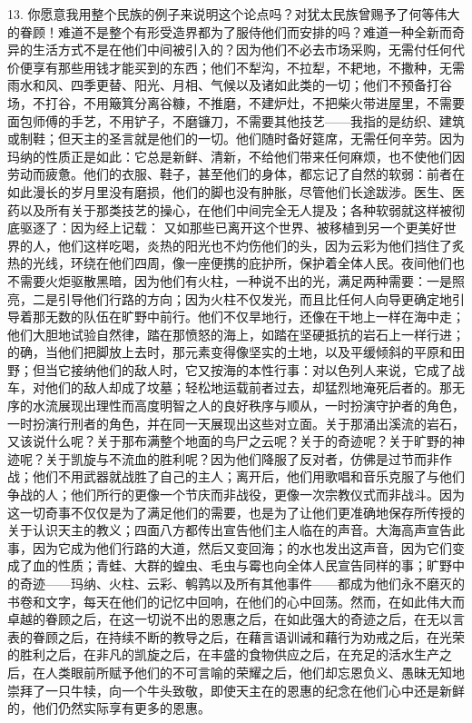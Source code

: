 13. 你愿意我用整个民族的例子来说明这个论点吗？对犹太民族曾赐予了何等伟大的眷顾！难道不是整个有形受造界都为了服侍他们而安排的吗？难道一种全新而奇异的生活方式不是在他们中间被引入的？因为他们不必去市场采购，无需付任何代价便享有那些用钱才能买到的东西；他们不犁沟，不拉犁，不耙地，不撒种，无需雨水和风、四季更替、阳光、月相、气候以及诸如此类的一切；他们不预备打谷场，不打谷，不用簸箕分离谷糠，不推磨，不建炉灶，不把柴火带进屋里，不需要面包师傅的手艺，不用铲子，不磨镰刀，不需要其他技艺——我指的是纺织、建筑或制鞋；但天主的圣言就是他们的一切。他们随时备好筵席，无需任何辛劳。因为玛纳的性质正是如此：它总是新鲜、清新，不给他们带来任何麻烦，也不使他们因劳动而疲惫。他们的衣服、鞋子，甚至他们的身体，都忘记了自然的软弱：前者在如此漫长的岁月里没有磨损，他们的脚也没有肿胀，尽管他们长途跋涉。医生、医药以及所有关于那类技艺的操心，在他们中间完全无人提及；各种软弱就这样被彻底驱逐了：因为经上记载： 又如那些已离开这个世界、被移植到另一个更美好世界的人，他们这样吃喝，炎热的阳光也不灼伤他们的头，因为云彩为他们挡住了炙热的光线，环绕在他们四周，像一座便携的庇护所，保护着全体人民。夜间他们也不需要火炬驱散黑暗，因为他们有火柱，一种说不出的光，满足两种需要：一是照亮，二是引导他们行路的方向；因为火柱不仅发光，而且比任何人向导更确定地引导着那无数的队伍在旷野中前行。他们不仅旱地行，还像在干地上一样在海中走；他们大胆地试验自然律，踏在那愤怒的海上，如踏在坚硬抵抗的岩石上一样行进；的确，当他们把脚放上去时，那元素变得像坚实的土地，以及平缓倾斜的平原和田野；但当它接纳他们的敌人时，它又按海的本性行事：对以色列人来说，它成了战车，对他们的敌人却成了坟墓；轻松地运载前者过去，却猛烈地淹死后者的。那无序的水流展现出理性而高度明智之人的良好秩序与顺从，一时扮演守护者的角色，一时扮演行刑者的角色，并在同一天展现出这些对立面。关于那涌出溪流的岩石，又该说什么呢？关于那布满整个地面的鸟尸之云呢？关于的奇迹呢？关于旷野的神迹呢？关于凯旋与不流血的胜利呢？因为他们降服了反对者，仿佛是过节而非作战；他们不用武器就战胜了自己的主人；离开后，他们用歌唱和音乐克服了与他们争战的人；他们所行的更像一个节庆而非战役，更像一次宗教仪式而非战斗。因为这一切奇事不仅仅是为了满足他们的需要，也是为了让他们更准确地保存所传授的关于认识天主的教义；四面八方都传出宣告他们主人临在的声音。大海高声宣告此事，因为它成为他们行路的大道，然后又变回海；的水也发出这声音，因为它们变成了血的性质；青蛙、大群的蝗虫、毛虫与霉也向全体人民宣告同样的事；旷野中的奇迹——玛纳、火柱、云彩、鹌鹑以及所有其他事件——都成为他们永不磨灭的书卷和文字，每天在他们的记忆中回响，在他们的心中回荡。然而，在如此伟大而卓越的眷顾之后，在这一切说不出的恩惠之后，在如此强大的奇迹之后，在无以言表的眷顾之后，在持续不断的教导之后，在藉言语训诫和藉行为劝戒之后，在光荣的胜利之后，在非凡的凯旋之后，在丰盛的食物供应之后，在充足的活水生产之后，在人类眼前所赋予他们的不可言喻的荣耀之后，他们却忘恩负义、愚昧无知地崇拜了一只牛犊，向一个牛头致敬，即使天主在的恩惠的纪念在他们心中还是新鲜的，他们仍然实际享有更多的恩惠。\par

